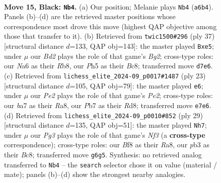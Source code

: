 \documentclass[11pt]{article}
\begin{document}
\clearpage

\begin{figure}[p]\centering
\begin{subfigure}{0.46\textwidth}\centering
\resizebox{\linewidth}{!}{%
\newchessgame
\chessboard[
  setfen={r3kb1r/Bp1bpp1n/n2p2p1/qN5p/4P3/1PNB1P2/P1P2QPP/2K1R2R b kq - 0 15},
  showmover=false,
  pgfstyle=straightmove, color=movearrow, markmove={a6-b4}
]}
\caption{}
\end{subfigure}\hfill
\begin{subfigure}{0.46\textwidth}\centering
\resizebox{\linewidth}{!}{%
\newchessgame
\chessboard[
  setfen={1rb1r1k1/5pbp/p2p2p1/2pPN2n/4P3/1qNQ2P1/1P3PBP/R1B2RK1 b - - 0 19},
  showmover=false,
  pgfstyle=straightmove, color=movearrow, markmove={g7-e5}
]}
\caption{}
\end{subfigure}
\\[4pt]
\begin{subfigure}{0.46\textwidth}\centering
\resizebox{\linewidth}{!}{%
\newchessgame
\chessboard[
  setfen={r2r2k1/pp1bppbp/n4np1/qN1P4/5B2/1QN1P3/PP2BPPP/R4RK1 b - - 6 12},
  showmover=false,
  pgfstyle=straightmove, color=movearrow, markmove={e7-e6}
]}
\caption{}
\end{subfigure}\hfill
\begin{subfigure}{0.46\textwidth}\centering
\resizebox{\linewidth}{!}{%
\newchessgame
\chessboard[
  setfen={r1bb1rk1/pp4p1/2pp1n1p/P3p2q/4P3/3P1N1P/P1PBQPP1/R2NR1K1 b - - 1 15},
  showmover=false,
  pgfstyle=straightmove, color=movearrow, markmove={f6-h7}
]}
\caption{}
\end{subfigure}
\caption{\textbf{Move 15, Black: \texttt{Nb4}.} (a) Our position; Melanie plays \texttt{Nb4} (\texttt{a6b4}). Panels (b)--(d) are the retrieved master positions whose correspondence most drove this move (highest QAP objective among those that transfer to it). (b) Retrieved from \texttt{twic1500\#296} (ply 37) [structural distance $d$=133, QAP obj=143]: the master played \texttt{Bxe5}; under $\mu$ our \emph{Bd2} plays the role of that game's \emph{Bg2}; cross-type roles: our \emph{N}a6 as their \emph{R}b8, our \emph{P}h5 as their \emph{B}c8; transferred move \texttt{d7e6}. (c) Retrieved from \texttt{lichess\_elite\_2024-09\_p0017\#1487} (ply 23) [structural distance $d$=105, QAP obj=79]: the master played \texttt{e6}; under $\mu$ our \emph{Pe2} plays the role of that game's \emph{Pe2}; cross-type roles: our \emph{b}a7 as their \emph{R}a8, our \emph{P}b7 as their \emph{R}d8; transferred move \texttt{e7e6}. (d) Retrieved from \texttt{lichess\_elite\_2024-09\_p0010\#852} (ply 29) [structural distance $d$=135, QAP obj=51]: the master played \texttt{Nh7}; under $\mu$ our \emph{Pg3} plays the role of that game's \emph{Nf3} (a \textbf{cross-type} correspondence); cross-type roles: our \emph{B}f8 as their \emph{R}a8, our \emph{p}b3 as their \emph{B}c8; transferred move \texttt{g6g5}. Synthesis: no retrieved analog transferred to \texttt{Nb4} -- the \texttt{search} selector chose it on value (material / mate); panels (b)--(d) show the strongest nearby analogies.}
\label{fig:thought-m29}
\end{figure}
\end{document}
